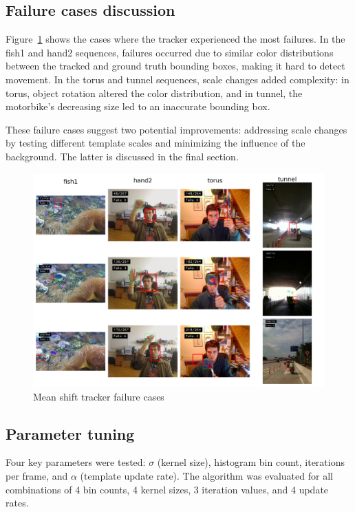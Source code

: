 \documentclass[9pt]{IEEEtran}
\begin{document}
  
  \subsection{Failure cases discussion}
  Figure~\ref{fig:failures} shows the cases where the tracker experienced the most failures.
   In the fish1 and hand2 sequences, failures occurred due to similar color distributions 
   between the tracked and ground truth bounding boxes, making it hard to detect movement.
    In the torus and tunnel sequences, scale changes added complexity: in torus, object 
    rotation altered the color distribution, and in tunnel, the motorbike’s decreasing size 
    led to an inaccurate bounding box.

  These failure cases suggest two potential improvements: addressing scale changes by testing
   different template scales and minimizing the influence of the background. The latter is 
   discussed in the final section.

  \begin{figure}[h]
    \centering
    \includegraphics[width=0.99\columnwidth]{figures/failures.png}
    \caption{Mean shift tracker failure cases}
    \label{fig:failures}
  \end{figure}

\subsection{Parameter tuning}
Four key parameters were tested: $\sigma$ (kernel size), histogram bin count, 
iterations per frame, and $\alpha$ (template update rate). The algorithm was 
evaluated for all combinations of 4 bin counts, 4 kernel sizes, 3 iteration values,
 and 4 update rates.
\end{document}
